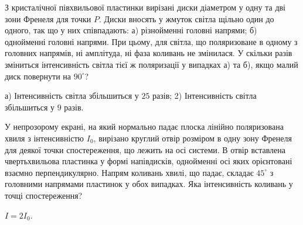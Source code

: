 \begin{problem}%
     З кристалічної півхвильової пластинки вирізані диски діаметром у одну та дві зони Френеля для точки $ P $. Диски вносять у жмуток світла щільно один до одного, так що у них співпадають: а) різнойменні головні напрями; б) однойменні головні напрями. При цьому, для світла, що поляризоване в одному з головних напрямів, ні амплітуда, ні фаза коливань не змінилася. У скільки разів зміниться інтенсивність світла тієї ж поляризації у випадках а) та б), якщо малий диск повернути на $ 90^\circ $?
    \begin{solution}
        а) Інтенсивність світла збільшиться у $ 25 $ разів; 2) Інтенсивність світла збільшиться у $ 9 $ разів.
    \end{solution}
\end{problem}

\begin{problem}%
     У непрозорому екрані, на який нормально падає плоска лінійно поляризована хвиля з інтенсивністю $ I_0 $, вирізано круглий отвір розміром в одну зону Френеля для деякої точки спостереження, що лежить на осі системи. В отвір вставлена чвертьхвильова пластинка у формі напівдисків, однойменні осі яких орієнтовані взаємно перпендикулярно. Напрям коливань хвилі, що падає, складає $ 45^\circ $ з головними напрямами пластинок у обох випадках. Яка інтенсивність коливань у точці спостереження?
    \begin{solution}
        $ I = 2I_0 $.
    \end{solution}
\end{problem}

